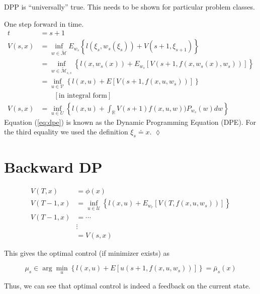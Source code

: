 DPP is ``universally'' true.
This needs to be shown for particular problem classes.

\begin{example}
One step forward in time.
\begin{align}
\label{eq:dpe}
t &= s+1 \nonumber \\
V(s,x) &= \inf_{w\in\tilde{\mathcal{M}}} E_{w_s}\left\lbrace l(\xi_s,w_s(\xi_s)) + V(s+1,\xi_{s+1})\right\rbrace \nonumber \\
&= \inf_{w\in\tilde{\mathcal{M}}_{s,s}} \left\lbrace l(x,w_s(x)) + E_{w_s}[V(s+1,f(x,w_s(x),w_s))]\right\rbrace \nonumber \\
&= \inf_{u\in\mathcal{V}} \left\lbrace l(x,u) + E[V(s+1,f(x,u,w_s))]\right\rbrace \nonumber \\
&\qquad [\text{in~integral~form}] \nonumber \\
V(s,x) &= \inf_{u\in U} \left\lbrace l(x,u) + \int_{\mathbb{R}}V(s+1)f(x,u,w))P_{w_s}(w)dw\right\rbrace
\end{align}
Equation (\ref{eq:dpe}) is known as the Dynamic Programming Equation (DPE).
For the third equality we used the definition $\xi_s \doteq x$.
$\lozenge$
\end{example}

\section{Backward DP}
\begin{align*}
V(T,x) &= \phi(x) \\
V(T-1,x) &= \inf_{u\in\mathcal{U}} \left\lbrace l(x,u) + E_{w_r}[V(T,f(x,u,w_s))]\right\rbrace \\
V(T-1,x) &= \cdots \\
&\vdots \\
&= V(s,x)
\end{align*}

This gives the optimal control (if minimizer exists) as

\begin{equation*}
\mu_s \in \arg\min_{u} \left\lbrace l(x,u) + E[u(s+1,f(x,u,w_s))]\right\rbrace = \bar{\mu}_s(x)
\end{equation*}

Thus, we can see that optimal control is indeed a feedback on the current state.%
